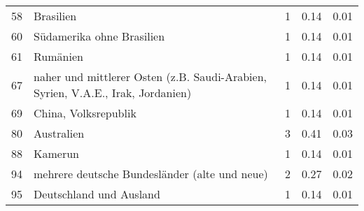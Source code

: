 \begin{longtable}{lXrrr}
        58 & \multicolumn{1}{X}{Brasilien} & %
          \num{1} &
          \num[round-mode=places,round-precision=2]{0.14} &
          \num[round-mode=places,round-precision=2]{0.01} \\

        60 & \multicolumn{1}{X}{Südamerika ohne Brasilien} & %
          \num{1} &
          \num[round-mode=places,round-precision=2]{0.14} &
          \num[round-mode=places,round-precision=2]{0.01} \\

        61 & \multicolumn{1}{X}{Rumänien} & %
          \num{1} &
          \num[round-mode=places,round-precision=2]{0.14} &
          \num[round-mode=places,round-precision=2]{0.01} \\

        67 & \multicolumn{1}{X}{naher und mittlerer Osten (z.B. Saudi-Arabien, Syrien, V.A.E., Irak, Jordanien)} & %
          \num{1} &
          \num[round-mode=places,round-precision=2]{0.14} &
          \num[round-mode=places,round-precision=2]{0.01} \\

        69 & \multicolumn{1}{X}{China, Volksrepublik} & %
          \num{1} &
          \num[round-mode=places,round-precision=2]{0.14} &
          \num[round-mode=places,round-precision=2]{0.01} \\

        80 & \multicolumn{1}{X}{Australien} & %
          \num{3} &
          \num[round-mode=places,round-precision=2]{0.41} &
          \num[round-mode=places,round-precision=2]{0.03} \\

        88 & \multicolumn{1}{X}{Kamerun} & %
          \num{1} &
          \num[round-mode=places,round-precision=2]{0.14} &
          \num[round-mode=places,round-precision=2]{0.01} \\

        94 & \multicolumn{1}{X}{mehrere deutsche Bundesländer (alte und neue)} & %
          \num{2} &
          \num[round-mode=places,round-precision=2]{0.27} &
          \num[round-mode=places,round-precision=2]{0.02} \\

        95 & \multicolumn{1}{X}{Deutschland und Ausland} & %
          \num{1} &
          \num[round-mode=places,round-precision=2]{0.14} &
          \num[round-mode=places,round-precision=2]{0.01} \\


\end{longtable}
